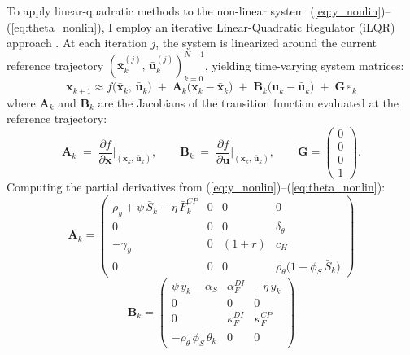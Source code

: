 \documentclass[12pt, a4paper]{article}
\begin{document}
To apply linear-quadratic methods to the non-linear
system~(\ref{eq:y_nonlin})--(\ref{eq:theta_nonlin}), I employ an iterative
Linear-Quadratic Regulator (iLQR) approach \citep{li2004iterative}. At each
iteration $j$, the system is linearized around the current reference trajectory
$(\bar{\bm{x}}_k^{(j)},\, \bar{\bm{u}}_k^{(j)})_{k=0}^{N-1}$, yielding
time-varying system matrices:
%
\begin{equation}
    \bm{x}_{k+1} \approx f\bigl(\bar{\bm{x}}_k,\, \bar{\bm{u}}_k\bigr)
    \;+\; \bm{A}_k\bigl(\bm{x}_k - \bar{\bm{x}}_k\bigr)
    \;+\; \bm{B}_k\bigl(\bm{u}_k - \bar{\bm{u}}_k\bigr)
    \;+\; \bm{G}\,\varepsilon_k
    \label{eq:linearization}
\end{equation}
%
where $\bm{A}_k$ and $\bm{B}_k$ are the Jacobians of the transition function
evaluated at the reference trajectory:
%
\begin{equation}
    \bm{A}_k \;=\; \frac{\partial f}{\partial \bm{x}}
    \bigg|_{(\bar{\bm{x}}_k,\, \bar{\bm{u}}_k)}, \qquad
    \bm{B}_k \;=\; \frac{\partial f}{\partial \bm{u}}
    \bigg|_{(\bar{\bm{x}}_k,\, \bar{\bm{u}}_k)}, \qquad
    \bm{G} = \begin{pmatrix} 0 \\ 0 \\ 0 \\ 1 \end{pmatrix}.
    \label{eq:jacobians_def}
\end{equation}
%
Computing the partial derivatives from
(\ref{eq:y_nonlin})--(\ref{eq:theta_nonlin}):
%
\begin{equation}
\bm{A}_k = \begin{pmatrix}
\rho_y + \psi\,\bar{S}_k - \eta\,\bar{F}_k^{CP}
    & 0 & 0 & 0 \\[3pt]
0 & 0 & 0 & \delta_\theta \\[3pt]
-\gamma_y & 0 & (1+r) & c_H \\[3pt]
0 & 0 & 0 & \rho_\theta\bigl(1 - \phi_S\,\bar{S}_k\bigr)
\end{pmatrix}
\label{eq:Ak}
\end{equation}
%
\begin{equation}
\bm{B}_k = \begin{pmatrix}
\psi\,\bar{y}_k - \alpha_S
    & \alpha_F^{DI}
    & -\eta\,\bar{y}_k \\[3pt]
0 & 0 & 0 \\[3pt]
0 & \kappa_F^{DI} & \kappa_F^{CP} \\[3pt]
-\rho_\theta\,\phi_S\,\bar{\theta}_k & 0 & 0
\end{pmatrix}
\label{eq:Bk}
\end{equation}
\end{document}
